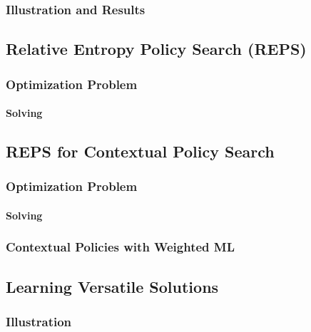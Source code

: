 			\subsubsection{Illustration and Results} %

		\subsection{Relative Entropy Policy Search (REPS)} %

			\subsubsection{Optimization Problem} %

				\paragraph{Solving} %

		\subsection{REPS for Contextual Policy Search} %

			\subsubsection{Optimization Problem} %

				\paragraph{Solving} %

			\subsubsection{Contextual Policies with Weighted ML} %

		\subsection{Learning Versatile Solutions} %

			\subsubsection{Illustration} %

